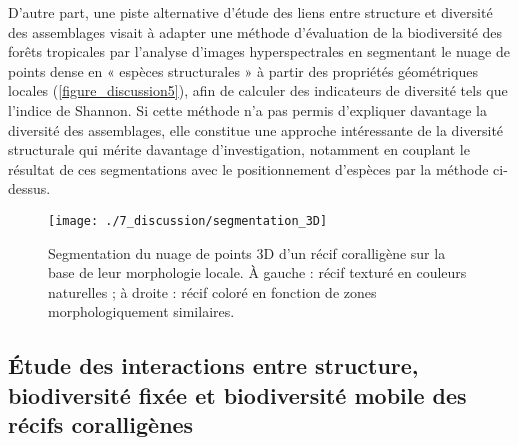 D’autre part, une piste alternative d’étude des liens entre structure et diversité des assemblages visait à adapter une méthode d’évaluation de la biodiversité des forêts tropicales par l’analyse d’images hyperspectrales \citep{feret_mapping_2014} en segmentant le nuage de points dense en « espèces structurales » à partir des propriétés géométriques locales (\autoref{figure_discussion5}), afin de calculer des indicateurs de diversité tels que l’indice de Shannon. Si cette méthode n’a pas permis d’expliquer davantage la diversité des assemblages, elle constitue une approche intéressante de la diversité structurale qui mérite davantage d’investigation, notamment en couplant le résultat de ces segmentations avec le positionnement d’espèces par la méthode ci-dessus.

\begin{figure}[H]
	\begin{center}
	\texttt{[image: ./7\_discussion/segmentation\_3D]}
		\caption[Segmentation du nuage de points 3D d’un récif coralligène sur la base de leur morphologie locale]{Segmentation du nuage de points 3D d’un récif coralligène sur la base de leur morphologie locale. À gauche : récif texturé en couleurs naturelles ; à droite : récif coloré en fonction de zones morphologiquement similaires.}
	\label{figure_discussion5}
\end{center}
\end{figure}

\subsection{Étude des interactions entre structure, biodiversité fixée et biodiversité mobile des récifs coralligènes}

